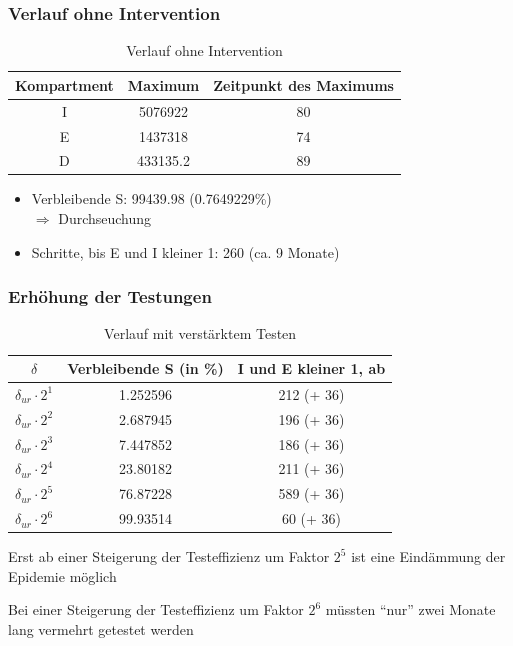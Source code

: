 \documentclass{beamer}
\begin{document}
\begin{frame}
	\frametitle{Verlauf ohne Intervention}
	\begin{table}[h]
		\caption{Verlauf ohne Intervention}
		\centering
		\begin{tabular}{@{}ccc@{}}
			\toprule
			Kompartment & Maximum & Zeitpunkt des Maximums\\ 
			\midrule
			I &  5076922& 80\\ 
			E & 1437318 & 74\\ 
			D &  433135.2 & 89 \\ 
			\bottomrule
		\end{tabular}
	\end{table}
	\vspace{0.5cm}
	\begin{itemize}
		\item Verbleibende S: 99439.98 (0.7649229\%)\\	$\Rightarrow$ Durchseuchung
		\item Schritte, bis E und I kleiner 1: 260 (ca. 9 Monate)
	\end{itemize}
\end{frame}

\begin{frame}
	\frametitle{Erhöhung der Testungen}
	\begin{table}[h]
		\caption{Verlauf mit verstärktem Testen}
		\centering
		\begin{tabular}{@{}ccc@{}}
			\toprule
			$\delta$ & Verbleibende S (in \%) & I und E kleiner 1, ab\\ 
			\midrule
			 $\delta_{ur} \cdot 2^1$ & 1.252596 & 212 (+ 36) \\ 
			 $\delta_{ur} \cdot 2^2$ & 2.687945 & 196 (+ 36)\\  
			 $\delta_{ur} \cdot 2^3$ & 7.447852 & 186 (+ 36)\\ 
			 $\delta_{ur} \cdot 2^4$ & 23.80182 & 211 (+ 36)\\ 
			 $\delta_{ur} \cdot 2^5$ & 76.87228 & 589 (+ 36)\\ 
			 $\delta_{ur} \cdot 2^6$ & 99.93514 & 60 (+ 36)\\ 
			\bottomrule
		\end{tabular}
	\end{table}
	\vspace{0.5cm}
	\begin{arrowlist}
		\item Erst ab einer Steigerung der Testeffizienz um Faktor $2^5$ ist eine Eindämmung der Epidemie möglich
		\item Bei einer Steigerung der Testeffizienz um Faktor $2^6$ müssten \enquote{nur} zwei Monate lang vermehrt getestet werden
	\end{arrowlist}
\end{frame}
\end{document}
